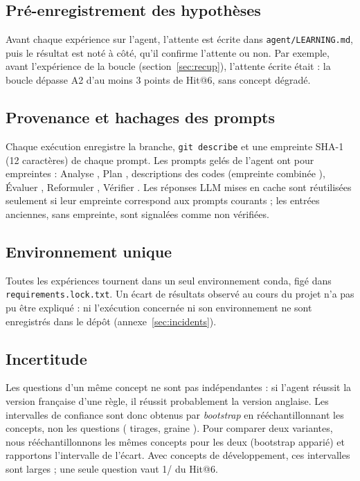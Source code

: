 \subsection{Pré-enregistrement des hypothèses}
Avant chaque expérience sur l'agent, l'attente est écrite dans \texttt{agent/LEARNING.md}, puis le résultat est noté
à côté, qu'il confirme l'attente ou non. Par exemple, avant l'expérience de la boucle (section~\ref{sec:recup}), l'attente
écrite était : la boucle dépasse A2 d'au moins 3 points de Hit@6, sans concept dégradé.

\subsection{Provenance et hachages des prompts}
Chaque exécution enregistre la branche, \texttt{git describe} et une empreinte SHA-1 (12 caractères) de chaque prompt.
Les prompts gelés de l'agent ont pour empreintes : Analyse \NHashAnalyze, Plan \NHashPlan, descriptions des codes \NHashCodes{}
(empreinte combinée \NHashCombined), Évaluer \NHashGrade, Reformuler \NHashReformulate, Vérifier \NHashVerify. Les réponses
LLM mises en cache sont réutilisées seulement si leur empreinte correspond aux prompts courants ; les entrées anciennes, sans
empreinte, sont signalées comme non vérifiées.

\subsection{Environnement unique}
Toutes les expériences tournent dans un seul environnement conda, figé dans \texttt{requirements.lock.txt}. Un écart de
résultats observé au cours du projet n'a pas pu être expliqué : ni l'exécution concernée ni son environnement ne sont
enregistrés dans le dépôt (annexe~\ref{sec:incidents}).

\subsection{Incertitude}
Les questions d'un même concept ne sont pas indépendantes : si l'agent réussit la version française d'une règle, il réussit
probablement la version anglaise. Les intervalles de confiance sont donc obtenus par \emph{bootstrap} en rééchantillonnant
les concepts, non les questions (\NBoot{} tirages, graine \NSeed). Pour comparer deux variantes, nous rééchantillonnons les
mêmes concepts pour les deux (bootstrap apparié) et rapportons l'intervalle de l'écart. Avec \NConceptsDev{} concepts de
développement, ces intervalles sont larges ; une seule question vaut 1/\NQDev{} du Hit@6.
